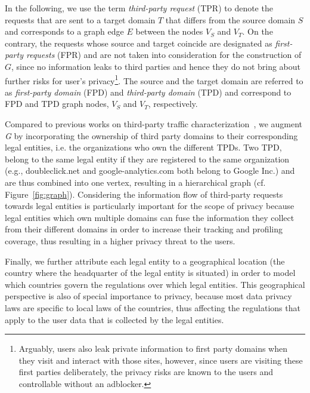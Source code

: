 \documentclass[compsoc, conference, letterpaper, 10pt, times]{IEEEtran}
\begin{document}
In the following, we use the term \textit{third-party request} (TPR) to denote the requests that are sent to a target domain $T$ that differs from the source domain $S$ and corresponds to a graph edge $E$ between the nodes $V_S$ and $V_T$. On the contrary, the requests whose source and target coincide are designated as \textit{first-party requests} (FPR) and are not taken into consideration for the construction of $G$, since no information leaks to third parties and hence they do not bring about further risks for user's privacy\footnote{Arguably, users also leak private information to first party domains when they visit and interact with those sites, however, since users are visiting these first parties deliberately, the privacy risks are known to the users and controllable without an adblocker.}. The source and the target domain are referred to as \textit{first-party domain} (FPD) and \textit{third-party domain} (TPD) and correspond to FPD and TPD graph nodes, $V_S$ and $V_T$, respectively.

Compared to previous works on third-party traffic characterization~\cite{butkiewicz,englehardt}, we augment \emph{G} by incorporating the ownership of third party domains to their corresponding legal entities, i.e. the organizations who own the different TPDs. Two TPD, belong to the same legal entity if they are registered to the same organization (e.g., doubleclick.net and google-analytics.com both belong to Google Inc.) and are thus combined into one vertex, resulting in a hierarchical graph (cf. Figure~\ref{fig:graph}). Considering the information flow of third-party requests towards legal entities is particularly important for the scope of privacy because legal entities which own multiple domains can fuse the information they collect from their different domains in order to increase their tracking and profiling coverage, thus resulting in a higher privacy threat to the users.

Finally, we further attribute each legal entity to a geographical location (the country where the headquarter of the legal entity is situated) in order to model which countries govern the regulations over which legal entities. This geographical perspective is also of special importance to privacy, because most data privacy laws are specific to local laws of the countries, thus affecting the regulations that apply to the user data that is collected by the legal entities.
\end{document}
